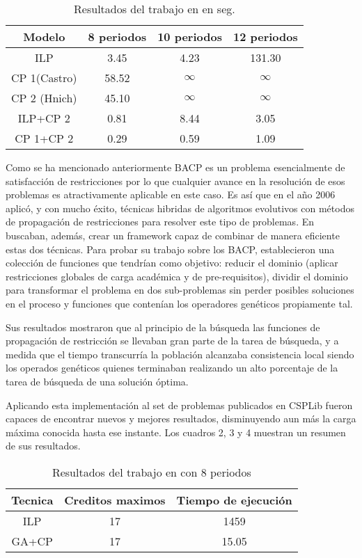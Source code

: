 \documentclass[letter, 10pt]{article}
\begin{document}
\begin{table}[h]
\centering
\caption{Resultados del trabajo en \cite{hnich2002modelling} en seg.}
\begin{tabular}{|c|c|c|c|}
\hline 
Modelo & 8 periodos & 10 periodos & 12 periodos\tabularnewline
\hline 
\hline 
ILP & 3.45 & 4.23 & 131.30\tabularnewline
\hline 
CP 1(Castro) & 58.52 & $\infty$ & $\infty$\tabularnewline
\hline 
CP 2 (Hnich) & 45.10 & $\infty$ & $\infty$\tabularnewline
\hline 
ILP+CP 2 & 0.81 & 8.44 & 3.05\tabularnewline
\hline 
CP 1+CP 2 & 0.29 & 0.59 & 1.09\tabularnewline
\hline 
\end{tabular}

\end{table}

Como se ha mencionado anteriormente BACP es un problema esencialmente de
satisfacción de restricciones por lo que cualquier avance en la resolución de
esos problemas es atractivamente aplicable en este caso. Es así que en el año
2006 \cite{lambert2006solving} aplicó, y con mucho éxito, técnicas hibridas de
algoritmos evolutivos con métodos de propagación de restricciones para resolver
este tipo de problemas. En \cite{lambert2006solving} buscaban, además, crear un
framework capaz de combinar de manera eficiente estas dos técnicas. Para probar
su trabajo sobre los BACP, establecieron una colección de funciones que tendrían
como objetivo: reducir el dominio (aplicar restricciones globales de carga
académica y de pre-requisitos), dividir el dominio para transformar el problema
en dos sub-problemas sin perder posibles soluciones en el proceso y funciones
que contenían los operadores genéticos propiamente tal.

Sus resultados mostraron que al principio de la búsqueda las funciones
de propagación de restricción se llevaban gran parte de la tarea de búsqueda, y a
medida que el tiempo transcurría la población alcanzaba consistencia local siendo
los operados genéticos quienes terminaban realizando un alto porcentaje de la
tarea de búsqueda de una solución óptima.

Aplicando esta implementación al set de problemas publicados en CSPLib fueron
capaces de encontrar nuevos y mejores resultados, disminuyendo aun más la carga
máxima conocida hasta ese instante. Los cuadros 2, 3 y 4 muestran un resumen de sus resultados.


\begin{table}[h]
\centering
\caption{Resultados del trabajo en  \cite{lambert2006solving} con 8 periodos}
\begin{tabular}{|c|c|c|}
\hline 
Tecnica & Creditos maximos & Tiempo de ejecución\tabularnewline
\hline 
\hline 
ILP & 17 & 1459\tabularnewline
\hline 
GA+CP & 17 & 15.05\tabularnewline
\hline 
\end{tabular}
\end{table}
\end{document}
